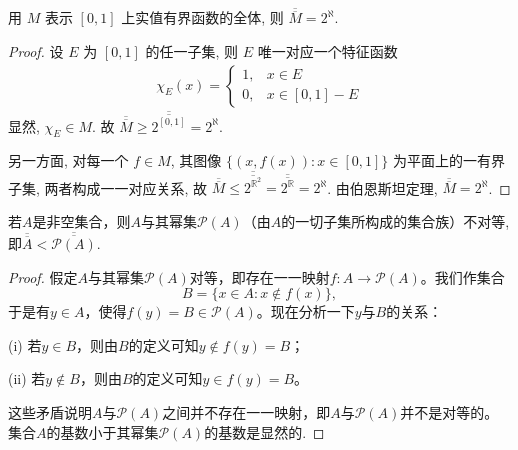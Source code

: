\documentclass[../../main.tex]{subfiles}%
\begin{document}
\begin{example}
用 $M$ 表示 $[0, 1]$ 上实值有界函数的全体, 则 $\overline{\overline{M}} = 2^{\aleph}$.
\end{example}
\begin{proof}

设 $E$ 为 $[0, 1]$ 的任一子集, 则 $E$ 唯一对应一个特征函数
\begin{align*}
\chi_E(x) = 
\begin{cases}
1, & x \in E\\
0, & x \in [0, 1] - E
\end{cases}
\end{align*}
显然, $\chi_E \in M$. 故 $\overline{\overline{M}} \geqslant \overline{\overline{2^{[0, 1]}}} = 2^{\aleph}$.

另一方面, 对每一个 $f \in M$, 其图像 $\{(x, f(x)) : x \in [0, 1]\}$ 为平面上的一有界子集, 两者构成一一对应关系, 故 $\overline{\overline{M}} \leqslant \overline{\overline{2^{\mathbb{R}^2}}} = \overline{\overline{2^{\mathbb{R}}}} = 2^{\aleph}$. 由伯恩斯坦定理, $\overline{\overline{M}} = 2^{\aleph}$. 

\end{proof}

\begin{theorem}[无最大基数定理]\label{theorem:无最大基数定理1}
若\(A\)是非空集合，则\(A\)与其幂集\(\mathcal{P}(A)\)（由\(A\)的一切子集所构成的集合族）不对等,即$\overline{\overline{A}} < \overline{\overline{\mathcal{P}(A)}}$.
\end{theorem}
\begin{proof}

假定\(A\)与其幂集\(\mathcal{P}(A)\)对等，即存在一一映射\(f:A\rightarrow\mathcal{P}(A)\)。我们作集合
\[B = \{x\in A:x\notin f(x)\},\]
于是有\(y\in A\)，使得\(f(y)=B\in\mathcal{P}(A)\)。现在分析一下\(y\)与\(B\)的关系：

(i) 若\(y\in B\)，则由\(B\)的定义可知\(y\notin f(y)=B\)；

(ii) 若\(y\notin B\)，则由\(B\)的定义可知\(y\in f(y)=B\)。

这些矛盾说明\(A\)与\(\mathcal{P}(A)\)之间并不存在一一映射，即\(A\)与\(\mathcal{P}(A)\)并不是对等的。集合\(A\)的基数小于其幂集\(\mathcal{P}(A)\)的基数是显然的.

\end{proof}
\end{document}
